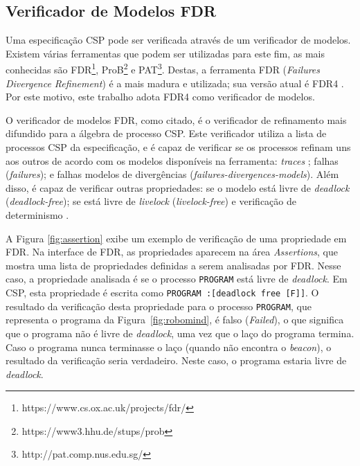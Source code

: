 \subsection{Verificador de Modelos FDR}

Uma especificação CSP pode ser verificada através de um verificador de modelos. Existem várias ferramentas que podem ser utilizadas para este fim, as mais conhecidas são FDR\footnote[4]{https://www.cs.ox.ac.uk/projects/fdr/}, ProB\footnote[5]{https://www3.hhu.de/stups/prob} e PAT\footnote[6]{http://pat.comp.nus.edu.sg/}. Destas, a ferramenta FDR (\textit{Failures Divergence Refinement}) é a mais madura e utilizada; sua versão atual é FDR4 \cite{Gibson}. Por este motivo, este trabalho adota FDR4 como verificador de modelos.

O verificador de modelos FDR, como citado, é o verificador de refinamento mais difundido para a álgebra de processo CSP. Este verificador utiliza a lista de processos CSP da especificação, e é capaz de verificar se os processos refinam uns aos outros de acordo com os modelos disponíveis na ferramenta: \textit{traces} ; falhas (\textit{failures}); e falhas modelos de divergências (\textit{failures-divergences-models}). Além disso, é capaz de verificar outras propriedades: se o modelo está livre de \textit{deadlock} (\textit{deadlock-free}); se está livre de \textit{livelock} (\textit{livelock-free}) e verificação de determinismo \cite{Gibson}.

A Figura \ref{fig:assertion} exibe um exemplo de verificação de uma propriedade em FDR. Na interface de FDR, as propriedades aparecem na área \textit{Assertions}, que mostra uma lista de propriedades definidas a serem analisadas por FDR. Nesse caso, a propriedade analisada é se o processo \texttt{PROGRAM} está livre de  \textit{deadlock}. Em CSP, esta propriedade é escrita como \texttt{PROGRAM :[deadlock free [F]]}. O resultado da verificação desta propriedade para o processo \texttt{PROGRAM}, que representa o programa da Figura~\ref{fig:robomind}, é falso (\textit{Failed}), o que significa que o programa não é livre de \textit{deadlock}, uma vez que o laço do programa termina. Caso o programa nunca terminasse o laço (quando não encontra o \textit{beacon}), o resultado da verificação seria verdadeiro. Neste caso, o programa estaria livre de \textit{deadlock}.

